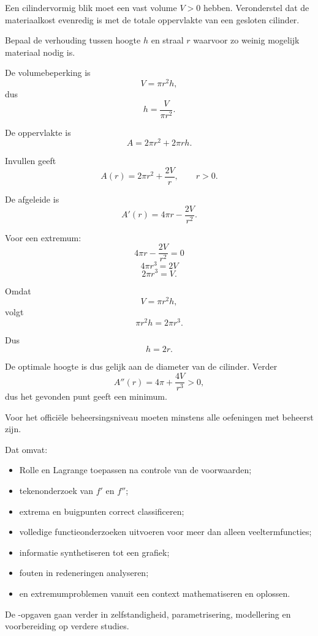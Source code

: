 \documentclass{ximera}
\begin{document}
\begin{oefening}{\oefG}
Een cilindervormig blik moet een vast volume \(V>0\) hebben.
Veronderstel dat de materiaalkost evenredig is met de totale oppervlakte
van een gesloten cilinder.

Bepaal de verhouding tussen hoogte \(h\) en straal \(r\) waarvoor zo
weinig mogelijk materiaal nodig is.

\begin{oplossing}
De volumebeperking is
\[
V=\pi r^2h,
\]
dus
\[
h=\frac{V}{\pi r^2}.
\]

De oppervlakte is
\[
A=2\pi r^2+2\pi rh.
\]

Invullen geeft
\[
A(r)=2\pi r^2+\frac{2V}{r},
\qquad r>0.
\]

De afgeleide is
\[
A'(r)=4\pi r-\frac{2V}{r^2}.
\]

Voor een extremum:
\[
4\pi r-\frac{2V}{r^2}=0
\]
\[
4\pi r^3=2V
\]
\[
2\pi r^3=V.
\]

Omdat
\[
V=\pi r^2h,
\]
volgt
\[
\pi r^2h=2\pi r^3.
\]

Dus
\[
\boxed{h=2r}.
\]

De optimale hoogte is dus gelijk aan de diameter van de cilinder.
Verder
\[
A''(r)=4\pi+\frac{4V}{r^3}>0,
\]
dus het gevonden punt geeft een minimum.
\end{oplossing}
\end{oefening}

\begin{opmerking}
Voor het officiële beheersingsniveau moeten minstens alle oefeningen met
\ESS beheerst zijn.

Dat omvat:

\begin{itemize}
  \item Rolle en Lagrange toepassen na controle van de voorwaarden;
  \item tekenonderzoek van \(f'\) en \(f''\);
  \item extrema en buigpunten correct classificeren;
  \item volledige functieonderzoeken uitvoeren voor meer dan alleen
  veeltermfuncties;
  \item informatie synthetiseren tot een grafiek;
  \item fouten in redeneringen analyseren;
  \item en extremumproblemen vanuit een context mathematiseren en oplossen.
\end{itemize}

De \oefG-opgaven gaan verder in zelfstandigheid, parametrisering,
modellering en voorbereiding op verdere studies.
\end{opmerking}

\FVDendExercises
\end{document}
